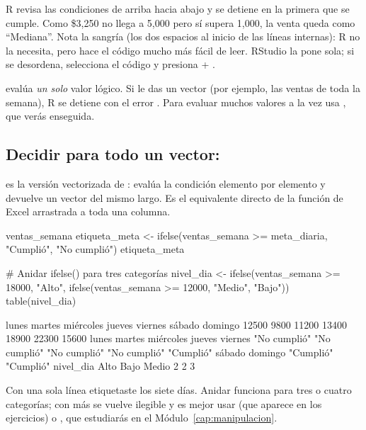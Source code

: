 R revisa las condiciones de arriba hacia abajo y se detiene en la primera
que se cumple. Como \$3,250 no llega a 5,000 pero sí supera 1,000, la venta
queda como ``Mediana''. Nota la sangría (los dos espacios al inicio de las
líneas internas): R no la necesita, pero hace el código mucho más fácil de
leer. RStudio la pone sola; si se desordena, selecciona el código y
presiona  + .

\begin{advertencia}
 evalúa \emph{un solo} valor lógico. Si le das un vector
(por ejemplo, las ventas de toda la semana), R se detiene con el error
. Para evaluar muchos valores a la
vez usa , que verás enseguida.
\end{advertencia}

\subsection{Decidir para todo un vector: \texorpdfstring{}{ifelse()}}

 es la versión
vectorizada de : evalúa la condición elemento por elemento y
devuelve un vector del mismo largo. Es el equivalente directo de la
función  de Excel arrastrada a toda una columna.

\begin{rcode}
ventas_semana
etiqueta_meta <- ifelse(ventas_semana >= meta_diaria,
                        "Cumplió", "No cumplió")
etiqueta_meta

# Anidar ifelse() para tres categorías
nivel_dia <- ifelse(ventas_semana >= 18000, "Alto",
                    ifelse(ventas_semana >= 12000, "Medio", "Bajo"))
table(nivel_dia)
\end{rcode}
\begin{rsalida}
    lunes    martes miércoles    jueves   viernes    sábado   domingo 
    12500      9800     11200     13400     18900     22300     15600 
       lunes       martes    miércoles       jueves      viernes 
"No cumplió" "No cumplió" "No cumplió" "No cumplió"    "Cumplió" 
      sábado      domingo 
   "Cumplió"    "Cumplió" 
nivel_dia
 Alto  Bajo Medio 
    2     2     3 
\end{rsalida}

Con una sola línea etiquetaste los siete días. Anidar 
funciona para tres o cuatro categorías; con más se vuelve ilegible y es
mejor usar  (que aparece en los ejercicios) o
, que estudiarás en el Módulo~\ref{cap:manipulacion}.

